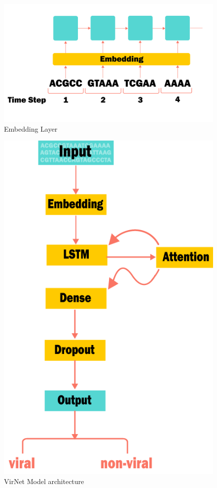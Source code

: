 \documentclass[conference]{IEEEtran}
\begin{document}
\begin{figure}
	\centering
	\includegraphics[width=\columnwidth]{imgs/encoder.PNG}
	\caption{Embedding Layer}
	\label{fig:encoder}
\end{figure}

\begin{figure}
	\centering
	\includegraphics[width=0.75\columnwidth]{imgs/model_diagram.PNG}
	\caption{VirNet Model architecture}
	\label{fig:model_diagram}
\end{figure}
\end{document}
